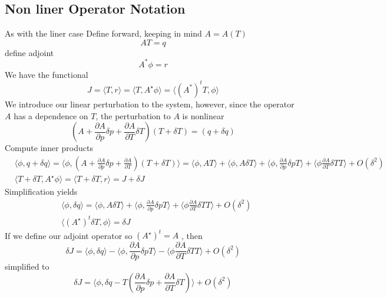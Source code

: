 \documentclass[11pt]{article}
\newcommand{\der}[2]{\frac{\partial #1}{\partial #2}}
\begin{document}
\subsection{Non liner Operator Notation}
As with the liner case Define forward, keeping in mind $A=A(T)$
\[
AT=q
\]
define adjoint
\[
A^* \phi =r
\]
We have the functional
\[
J=\langle T,r \rangle = \langle T, A^\star \phi \rangle = \langle (A^*)^t T,\phi \rangle
\]
We introduce our linear perturbation to the system, however, since the operator $A$ has a dependence on $T$, the perturbation to $A$ is nonlinear
\begin{equation}
(A+\der{A}{p} \delta p + \der{A}{T} \delta T)(T + \delta T)=(q+\delta q)
\end{equation}
Compute inner products
\begin{align}
& \langle \phi, q + \delta q \rangle = \langle \phi, (A+\der{A}{p} \delta p + \der{A}{T})(T + \delta T) \rangle = \langle \phi , AT \rangle + \langle \phi , A \delta  T \rangle + \langle \phi , \der{A}{p} \delta p T \rangle + \langle \phi \der{A}{T} \delta T T \rangle + O(\delta^2) \\ 
&\langle T+\delta T, A^\star \phi  \rangle = \langle T+\delta T, r \rangle = J + \delta J
\end{align}
Simplification yields
\begin{align}
& \langle \phi,\delta q \rangle =  \langle \phi , A \delta  T \rangle + \langle \phi , \der{A}{p} \delta p T \rangle + \langle \phi \der{A}{T} \delta T T \rangle + O(\delta^2) \\ 
&\langle (A^\star)^t \delta T,\phi  \rangle =  \delta J
\end{align}
If we define our adjoint operator so $(A^\star)^t = A$ , then
\begin{equation}
\delta J =  \langle \phi,\delta q \rangle - \langle \phi , \der{A}{p} \delta p T \rangle - \langle \phi \der{A}{T} \delta T T \rangle + O(\delta^2)
\end{equation}
simplified to 
\begin{equation}
\delta J =  \langle \phi,\delta q - T(\der{A}{p} \delta p +\der{A}{T} \delta T)\rangle + O(\delta^2)
\end{equation}



\newpage
\end{document}
